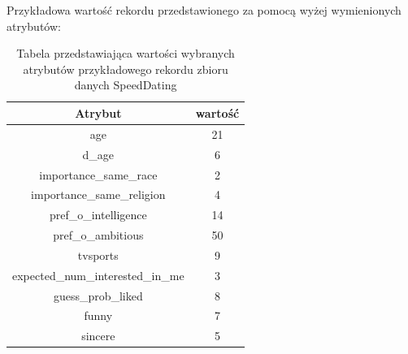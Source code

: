 \documentclass{classrep}
\begin{document}
Przykładowa wartość rekordu przedstawionego za pomocą wyżej wymienionych atrybutów:
\begin{table}[ht]
\centering
\begin{tabular}{|c|c|}
  \hline
  \textbf{Atrybut} & \textbf{wartość}\\ [0.5ex] 
  \hline
  \hline 
  age & 21 \\ \hline
  d\_age & 6 \\ \hline
  importance\_same\_race & 2 \\ \hline
  importance\_same\_religion & 4 \\ \hline
  pref\_o\_intelligence & 14 \\ \hline
  pref\_o\_ambitious & 50 \\ \hline
  tvsports & 9 \\ \hline
  expected\_num\_interested\_in\_me & 3 \\ \hline
  guess\_prob\_liked & 8 \\ \hline
  funny & 7 \\ \hline
  sincere& 5 \\ \hline
\end{tabular}
\caption{Tabela przedstawiająca wartości wybranych atrybutów przykładowego rekordu zbioru danych SpeedDating \cite{database}}
\end{table}
\end{document}
